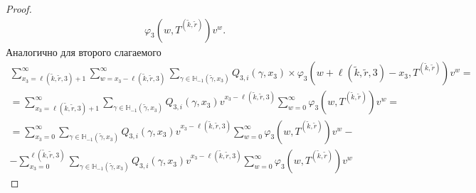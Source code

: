\documentclass[a4paper,12pt,russian]{extarticle}
\begin{document}
\begin{proof}
\begin{multline}
\varphi_3(w,T^{(\tilde{k},\tilde{r})}) v^w.
\label{sum:one}
\end{multline}
Аналогично для второго слагаемого
\begin{multline}
 \sum_{x_3=\ell(\tilde{k},\tilde{r},3) + 1}^{\infty}\sum_{w=x_3-\ell(\tilde{k},\tilde{r},3)}^{\infty} \sum_{\gamma \in {\mathbb H}_{-1}(\tilde{\gamma},x_3)} Q_{3,i}(\gamma,x_3) \times 
\varphi_3(w + \ell(\tilde{k},\tilde{r},3) - x_3,T^{(\tilde{k},\tilde{r})}) v^w = \\
=  \sum_{x_3=\ell(\tilde{k},\tilde{r},3) + 1}^{\infty} \sum_{\gamma \in {\mathbb H}_{-1}(\tilde{\gamma},x_3)} Q_{3,i}(\gamma,x_3) v^{x_3-\ell(\tilde{k},\tilde{r},3)}\sum_{w=0}^{\infty}  
\varphi_3(w,T^{(\tilde{k},\tilde{r})}) v^w = \\
= \sum_{x_3=0}^{\infty} \sum_{\gamma \in {\mathbb H}_{-1}(\tilde{\gamma},x_3)} Q_{3,i}(\gamma,x_3) v^{x_3-\ell(\tilde{k},\tilde{r},3)}\sum_{w=0}^{\infty} 
\varphi_3(w,T^{(\tilde{k},\tilde{r})}) v^w - \\
- \sum_{x_3=0}^{\ell(\tilde{k},\tilde{r},3)} \sum_{\gamma \in {\mathbb H}_{-1}(\tilde{\gamma},x_3)} Q_{3,i}(\gamma,x_3) v^{x_3-\ell(\tilde{k},\tilde{r},3)}\sum_{w=0}^{\infty}
\varphi_3(w,T^{(\tilde{k},\tilde{r})}) v^w
\label{sum:two}
\end{multline}


\end{proof}
\end{document}
